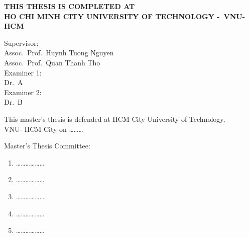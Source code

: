 \documentclass[a4paper,oneside]{book}
\begin{document}
\newpage
\begin{titlepage}

    \begin{center}
        {\fontsize{12pt}{1}\textbf{THIS THESIS IS COMPLETED AT}} \\
        \fontsize{12pt}{1}\textbf{HO CHI MINH CITY UNIVERSITY OF TECHNOLOGY -\ VNU-HCM}
    \end{center}

    \vspace{0.2cm}

    \begin{flushleft}
        {
        {\fontsize{12pt}{1}  Supervisor:}\\
        {\fontsize{12pt}{1}  Assoc.\ Prof.\ Huynh Tuong Nguyen}\\
        {\fontsize{12pt}{1}  Assoc.\ Prof.\ Quan Thanh Tho}\\
        {\fontsize{12pt}{1}  Examiner 1:}\\
        {\fontsize{12pt}{1}  Dr.\ A}\\
        {\fontsize{12pt}{1}  Examiner 2:}\\
        {\fontsize{12pt}{1}  Dr.\ B}\\
        }
    \end{flushleft}

    \vspace{0.2cm}

    \begin{center}
        {\fontsize{12pt}{1} This master's thesis is defended at HCM City University of Technology,}\\
        {\fontsize{12pt}{1} VNU- HCM City on \ldots\ldots\ldots}\\[0.2cm]
    \end{center}

    \vspace{0.1cm}

    \begin{flushleft}
        {{\fontsize{12}{1} Master's Thesis Committee:}}
        \begin{enumerate}
            \item \ldots\ldots\ldots\ldots\ldots\ldots
            \item \ldots\ldots\ldots\ldots\ldots\ldots
            \item \ldots\ldots\ldots\ldots\ldots\ldots
            \item \ldots\ldots\ldots\ldots\ldots\ldots
            \item \ldots\ldots\ldots\ldots\ldots\ldots
        \end{enumerate}


\end{flushleft}
\end{titlepage}
\end{document}
